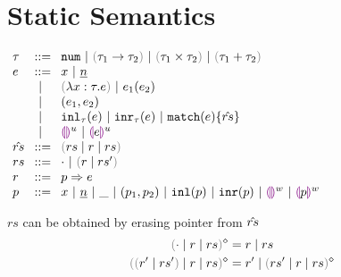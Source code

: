 \section{Static Semantics}
$\arraycolsep=4pt\begin{array}{lll}
\tau & ::= &
  \tnum ~\vert~
  \tarr{\tau_1}{\tau_2} ~\vert~
  \tprod{\tau_1}{\tau_2} ~\vert~
  \tsum{\tau_1}{\tau_2} \\
e & ::= &
  x ~\vert~
  \hnum{n} \\
  & ~\vert~ &
  \hlam{x}{\tau}{e} ~\vert~
  \hap{e_1}{e_2} \\
  & ~\vert~ &
  \hpair{e_1}{e_2} \\
  & ~\vert~ &
  \hinl{\tau}{e} ~\vert~
  \hinr{\tau}{e} ~\vert~
  \hmatch{e}{\hat{rs}} \\
  & ~\vert~ &
  \hehole{u} ~\vert~
  \hhole{e}{u} \\
\hat{rs} & ::= &
  \inparens{\zruls{rs}{r}{rs}} \\
rs & ::= &
  \cdot ~\vert~ \hrulesP{r}{rs'} \\
r & ::= &
  \hrul{p}{e} \\
p & ::= &
  x ~\vert~
  \hnum{n} ~\vert~
  \_ ~\vert~
  \hpair{p_1}{p_2} ~\vert~
  \hinlp{p} ~\vert~
  \hinrp{p} ~\vert~
  \hehole{w} ~\vert~
  \hhole{p}{w}
\end{array}$

        {$rs$ can be obtained by erasing pointer from $\hat{rs}$}
\begin{subequations}\label{defn:rmpointer}
\begin{align}
  \rmpointer{\zruls{\cdot}{r}{rs}} &= \hrules{r}{rs} \\
  \rmpointer{\zruls{\hrulesP{r'}{rs'}}{r}{rs}} &= \hrules{r'}{\rmpointer{\zruls{rs'}{r}{rs}}}
\end{align}
\end{subequations}

